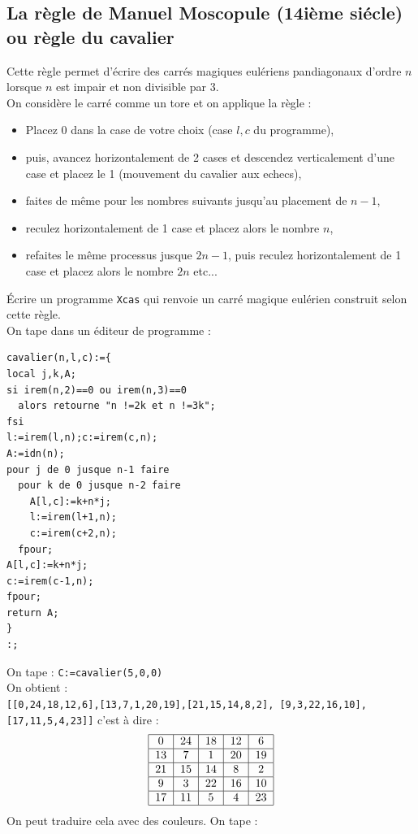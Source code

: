 \documentclass[a4paper,11pt]{book}
\begin{document}
\subsection{La r\`egle de Manuel Moscopule (14i\`eme si\'ecle) ou r\`egle du 
cavalier}
Cette r\`egle permet d'\'ecrire des carr\'es magiques eul\'eriens pandiagonaux
d'ordre $n$ lorsque $n$ est impair et non divisible par 3.\\
On consid\`ere le carr\'e comme un tore et on applique la r\`egle :
\begin{itemize}
\item Placez 0 dans la case de votre choix (case $l,c$ du programme),
\item puis, avancez horizontalement de 2 cases et descendez verticalement d'une
case et placez le 1 (mouvement du cavalier aux echecs),
\item faites de m\^eme pour les nombres suivants jusqu'au placement de $n-1$,
\item reculez horizontalement de 1 case et placez alors le nombre $n$,
\item refaites le m\^eme processus jusque $2n-1$, puis reculez horizontalement 
de 1 case et placez alors le nombre $2n$ etc...
\end{itemize}
\'Ecrire un programme {\tt Xcas} qui renvoie un carr\'e magique eul\'erien
construit selon cette r\`egle.\\
On tape dans un \'editeur de programme :
\begin{verbatim}
cavalier(n,l,c):={
local j,k,A;
si irem(n,2)==0 ou irem(n,3)==0 
  alors retourne "n !=2k et n !=3k"; 
fsi
l:=irem(l,n);c:=irem(c,n);
A:=idn(n);
pour j de 0 jusque n-1 faire
  pour k de 0 jusque n-2 faire
    A[l,c]:=k+n*j;
    l:=irem(l+1,n);
    c:=irem(c+2,n);
  fpour;
A[l,c]:=k+n*j;
c:=irem(c-1,n);
fpour;
return A;
}
:;
\end{verbatim}
On tape : {\tt C:=cavalier(5,0,0)}\\
On obtient : \\
{\tt [[0,24,18,12,6],[13,7,1,20,19],[21,15,14,8,2], [9,3,22,16,10],[17,11,5,4,23]]} c'est \`a dire :
$$
\begin{tabular}{|c|c|c|c|c|}
\hline
0&24&18&12&6\\
\hline
13&7&1&20&19\\
\hline
21&15&14&8&2\\
\hline
9&3&22&16&10\\
\hline
17&11&5&4&23\\
\hline
\end{tabular}
$$
On peut traduire cela avec des couleurs. On tape :
\end{document}
